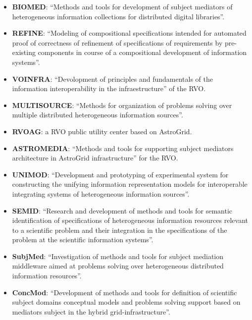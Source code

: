\begin{itemize}
\item \textbf{BIOMED}:
``Methods and tools for development of subject mediators of
he\-te\-ro\-ge\-neous information collections for distributed digital
libraries''.

\item \textbf{REFINE}:
``Modeling of compositional specifications intended for automated proof of
correctness of refinement of specifications of requirements by pre-existing
components in course of a compositional development of information systems''.

\item \textbf{VOINFRA}:
``Devolopment of principles and fundamentals of the information interoperability
in the infraestructure'' of the RVO.

\item \textbf{MULTISOURCE}:
``Methods for organization of problems solving over multiple distributed
heterogeneous information sources''.

\item \textbf{RVOAG}:
a RVO public utility center based on AstroGrid.

\item \textbf{ASTROMEDIA}:
``Methods and tools for supporting subject mediators architecture in AstroGrid
infrastructure'' for the RVO.

\item \textbf{UNIMOD}:
``Development and prototyping of experimental system for constructing the
unifying information representation models for interoperable integrating systems
of heterogeneous information sources''.

\item \textbf{SEMID}:
``Research and development of methods and tools for semantic identification of
specifications of heterogeneous information resources relevant to a scientific
problem and their integration in the specifications of the problem at the
scientific information systems''.

\item \textbf{SubjMed}:
``Investigation of methods and tools for subject mediation middleware aimed at
problems solving over heterogeneous distributed information resources''.

\item \textbf{ConcMod}:
``Development of methods and tools for definition of scientific subject domains
conceptual models and problems solving support based on mediators subject in the
hybrid grid-infrastructure''.


\end{itemize}
